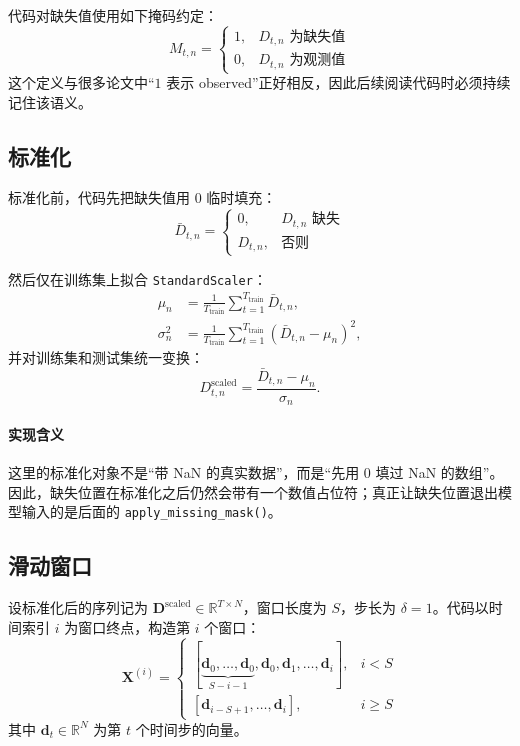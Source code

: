 \documentclass[UTF8]{ctexart}
\begin{document}
代码对缺失值使用如下掩码约定：
\begin{equation}
    M_{t,n} =
    \begin{cases}
        1, & D_{t,n}\text{ 为缺失值} \\
        0, & D_{t,n}\text{ 为观测值}
    \end{cases}
\end{equation}
这个定义与很多论文中“$1$ 表示 observed”正好相反，因此后续阅读代码时必须持续记住该语义。

\subsection{标准化}

标准化前，代码先把缺失值用 $0$ 临时填充：
\begin{equation}
    \bar{D}_{t,n} =
    \begin{cases}
        0, & D_{t,n}\text{ 缺失} \\
        D_{t,n}, & \text{否则}
    \end{cases}
\end{equation}

然后仅在训练集上拟合 \texttt{StandardScaler}：
\begin{align}
    \mu_n &= \frac{1}{T_{\text{train}}}\sum_{t=1}^{T_{\text{train}}}\bar{D}_{t,n}, \\
    \sigma_n^2 &= \frac{1}{T_{\text{train}}}\sum_{t=1}^{T_{\text{train}}}(\bar{D}_{t,n}-\mu_n)^2,
\end{align}
并对训练集和测试集统一变换：
\begin{equation}
    D^{\text{scaled}}_{t,n} = \frac{\bar{D}_{t,n} - \mu_n}{\sigma_n}.
\end{equation}

\paragraph{实现含义}
这里的标准化对象不是“带 NaN 的真实数据”，而是“先用 0 填过 NaN 的数组”。因此，缺失位置在标准化之后仍然会带有一个数值占位符；真正让缺失位置退出模型输入的是后面的 \texttt{apply\_missing\_mask()}。

\subsection{滑动窗口}

设标准化后的序列记为 $\bm{D}^{\text{scaled}} \in \mathbb{R}^{T \times N}$，窗口长度为 $S$，步长为 $\delta=1$。代码以时间索引 $i$ 为窗口终点，构造第 $i$ 个窗口：
\begin{equation}
    \bm{X}^{(i)} =
    \begin{cases}
        [\underbrace{\bm{d}_0,\dots,\bm{d}_0}_{S-i-1},\bm{d}_0,\bm{d}_1,\dots,\bm{d}_i], & i < S \\
        [\bm{d}_{i-S+1}, \dots, \bm{d}_i], & i \ge S
    \end{cases}
\end{equation}
其中 $\bm{d}_t \in \mathbb{R}^{N}$ 为第 $t$ 个时间步的向量。
\end{document}

